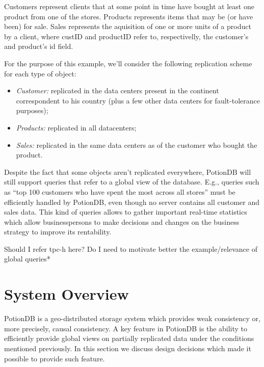 \documentclass{vldb}
\newcommand{\grumbler}[2]{{\color{red}{\bf #1:} #2}}
\newcommand{\andre}[1]{\grumbler{andre}{#1}}
\begin{document}
Customers represent clients that at some point in time have bought at least one product from one of the stores.
Products represents items that may be (or have been) for sale.
Sales represents the aquisition of one or more units of a product by a client, where custID and productID refer to, respectivelly, the customer's and product's id field.

For the purpose of this example, we'll consider the following replication scheme for each type of object:
\begin{itemize}
	\item \emph{Customer:} replicated in the data centers present in the continent correspondent to his country (plus a few other data centers for fault-tolerance purposes);
	\item \emph{Products:} replicated in all datacenters;
	\item \emph{Sales:} replicated in the same data centers as of the customer who bought the product. 
\end{itemize}

Despite the fact that some objects aren't replicated everywhere, PotionDB will still support queries that refer to a global view of the database.
E.g., queries such as ``top 100 customers who have spent the most across all stores'' must be efficiently handled by PotionDB, even though no server contains all customer and sales data. 
This kind of queries allows to gather important real-time statistics which allow businesspersons to make decisions and changes on the business strategy to improve its rentability.

\andre{Should I refer tpc-h here? Do I need to motivate better the example/relevance of global queries*}

\section{System Overview}

PotionDB is a geo-distributed storage system which provides weak consistency or, more precisely, causal consistency.
A key feature in PotionDB is the ability to efficiently provide global views on partially replicated data under the conditions mentioned previously.
In this section we discuss design decisions which made it possible to provide such feature.
\end{document}
